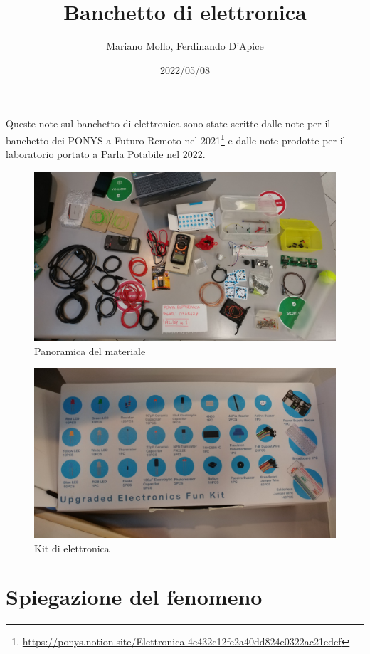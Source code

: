\documentclass[a4paper]{article}
\title{Banchetto di elettronica}
\author{Mariano Mollo, Ferdinando D'Apice}
\date{2022/05/08}
\begin{document}
\maketitle{}

Queste note sul banchetto di elettronica sono state scritte dalle note per il
banchetto dei PONYS a Futuro Remoto nel 2021\footnote{
  \url{https://ponys.notion.site/Elettronica-4e432c12fe2a40dd824e0322ac21edcf} }
e dalle note prodotte per il laboratorio portato a Parla Potabile nel 2022.

\begin{figure}[ht]
  \centering
  \includegraphics[width=\linewidth]{figures/panoramica_materiale}
  \caption{\label{fig:panoramica} Panoramica del materiale}
\end{figure}

\begin{figure}[ht]
  \centering
  \includegraphics[width=\linewidth]{figures/kit_elettronica}
  \caption{\label{fig:kit} Kit di elettronica}
\end{figure}

\section{Spiegazione del fenomeno}%
\label{sec:fenomeno}
\end{document}

